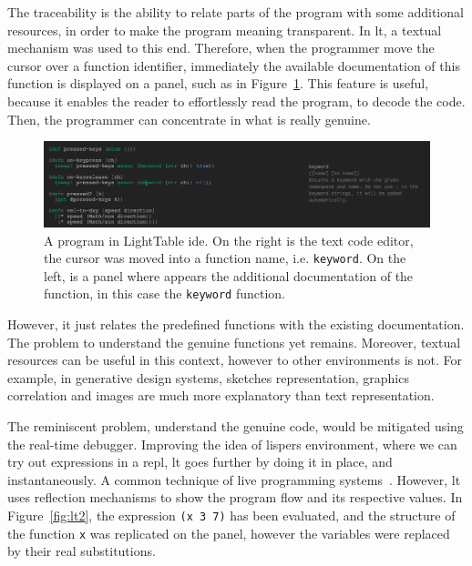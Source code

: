 The traceability is the ability to relate parts of the program with some additional resources, in order to make the program meaning transparent. In \ac{lt}, a textual mechanism was used to this end. Therefore, when the programmer move the cursor over a function identifier, immediately the available documentation of this function is displayed on a panel, such as in Figure~\ref{fig:lt1}. This feature is useful, because it enables the reader to effortlessly read the program, to decode the code. Then, the programmer can concentrate in what is really genuine.

\begin{figure}[!htbp]
  \centering
  \includegraphics[width=1.0\textwidth]{img/lt2}
    \caption{A program in LightTable \ac{ide}. On the right is the text code editor, the cursor was moved into a function name, i.e. {\tt keyword}. On the left, is a panel where appears the additional documentation of the function, in this case the {\tt keyword} function.}  
  \label{fig:lt1}
\end{figure}

However, it just relates the predefined functions with the existing documentation. The problem to understand the genuine functions yet remains. Moreover, textual resources can be useful in this context, however to other environments is not. For example, in generative design systems, sketches representation, graphics correlation and images are much more explanatory than text representation.  

The reminiscent problem, understand the genuine code, would be mitigated using the real-time debugger. Improving the idea of lispers environment, where we can try out expressions in a \ac{repl}, \ac{lt} goes further by doing it in place, and instantaneously. A common technique of live programming systems~\cite{PER-GRA:2007,sorensen2005impromptu,mclean2010visualisation}. However, \ac{lt} uses reflection mechanisms to show the program flow and its respective values. In Figure~\ref{fig:lt2},  the expression {\tt (x 3 7)} has been evaluated, and the structure of the function {\tt x} was replicated on the panel, however the variables were replaced by their real substitutions.

